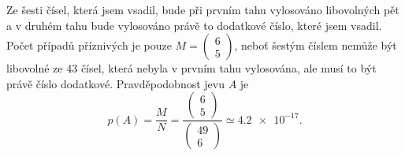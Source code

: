 \begin{example}
\begin{itemize}
          Ze šesti čísel, která jsem vsadil, bude při prvním tahu vylosováno libovolných pět a v 
          druhém tahu bude vylosováno právě to dodatkové číslo, které jsem vsadil. Počet případů 
          příznivých je pouze \(M = \begin{pmatrix}6 \\ 5\end{pmatrix}\), neboť šestým číslem 
          nemůže být libovolné ze \num{43} čísel, která nebyla v prvním tahu vylosována, ale 
          musí to být právě číslo dodatkové. Pravděpodobnost jevu \(A\) je
          \begin{equation*}
            p(A)  = \dfrac{M}{N} 
                  = \dfrac{\begin{pmatrix} 6  \\ 5\end{pmatrix}}
                          {\begin{pmatrix} 49 \\ 6\end{pmatrix}}
                  \simeq\num{4.2e-17}.
          \end{equation*}
          

\end{itemize}
\end{example}
